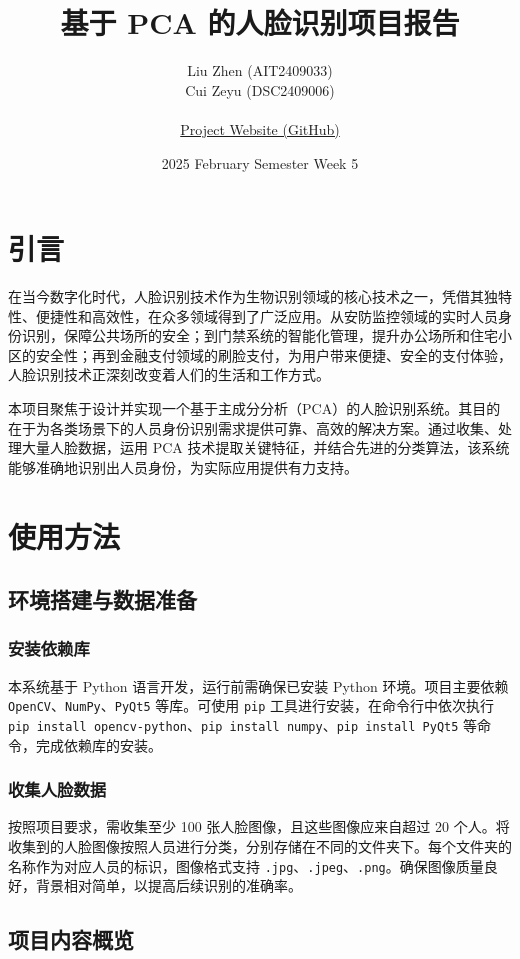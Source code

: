 \documentclass{article}
\title{基于 PCA 的人脸识别项目报告}
\date{2025 February Semester Week 5}
\author{
    Liu Zhen (AIT2409033) \\
    Cui Zeyu (DSC2409006) \\ \\
    \href{https://github.com/zeyu10/FaceRecognition}{Project Website (GitHub)}
}
\begin{document}
\maketitle

\tableofcontents
\newpage

\section{引言}
在当今数字化时代，人脸识别技术作为生物识别领域的核心技术之一，凭借其独特性、便捷性和高效性，在众多领域得到了广泛应用。从安防监控领域的实时人员身份识别，保障公共场所的安全；到门禁系统的智能化管理，提升办公场所和住宅小区的安全性；再到金融支付领域的刷脸支付，为用户带来便捷、安全的支付体验，人脸识别技术正深刻改变着人们的生活和工作方式。

本项目聚焦于设计并实现一个基于主成分分析（PCA）的人脸识别系统。其目的在于为各类场景下的人员身份识别需求提供可靠、高效的解决方案。通过收集、处理大量人脸数据，运用 PCA 技术提取关键特征，并结合先进的分类算法，该系统能够准确地识别出人员身份，为实际应用提供有力支持。
\newpage
\section{使用方法}

\subsection{环境搭建与数据准备}

\subsubsection{安装依赖库}
本系统基于 Python 语言开发，运行前需确保已安装 Python 环境。项目主要依赖 \texttt{OpenCV}、\texttt{NumPy}、\texttt{PyQt5} 等库。可使用 \texttt{pip} 工具进行安装，在命令行中依次执行 \texttt{pip install opencv-python}、\texttt{pip install numpy}、\texttt{pip install PyQt5} 等命令，完成依赖库的安装。

\subsubsection{收集人脸数据}
按照项目要求，需收集至少 100 张人脸图像，且这些图像应来自超过 20 个人。将收集到的人脸图像按照人员进行分类，分别存储在不同的文件夹下。每个文件夹的名称作为对应人员的标识，图像格式支持 \texttt{.jpg}、\texttt{.jpeg}、\texttt{.png}。确保图像质量良好，背景相对简单，以提高后续识别的准确率。

\subsection{项目内容概览}
\end{document}
